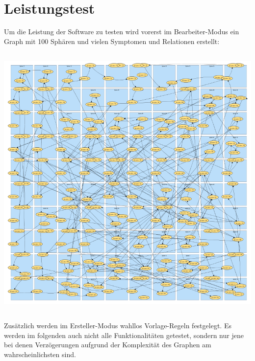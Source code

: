 \documentclass[enabledeprecatedfontcommands]{scrartcl}
\begin{document}
\section{Leistungstest}
Um die Leistung der Software zu testen wird vorerst im Bearbeiter-Modus ein Graph mit 100 Sphären und vielen Symptomen und Relationen erstellt:
\begin{center}
\includegraphics[height=14cm]{belastungstest.png}
\end{center}
Zusätzlich werden im Ersteller-Modus wahllos Vorlage-Regeln festgelegt. Es werden im folgenden auch nicht alle Funktionalitäten getestet, sondern nur jene bei denen Verzögerungen aufgrund der Komplexität des Graphen am wahrscheinlichsten sind. 
\newpage
\end{document}
